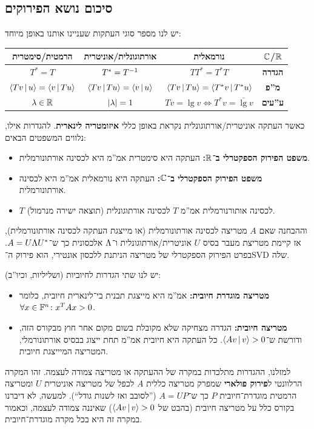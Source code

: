 \documentclass[name=רשימות אלגברה לינארית 2א]{../../../tex/classes/megasumPreamble}
\begin{document}
	\subsection{סיכום נושא הפירוקים}
	יש לנו מספר סוגי העתקות שעניינו אותנו באופן מיוחד: 
	\begin{center}\begin{tabular}{|c|c|c|c|}
			\hline \textbf{הרמטית}/\textbf{סימטרית} & \textbf{אורתוגונלית}/\textbf{אוניטרית} & \textbf{נורמאלית} & \textbf{$\mathbb{C}$/$\mathbb{R}$} \\
			\hline $T^* = T$ & $T^* = T^{-1}$ & $TT^* = T^*T$ & \textbf{הגדרה} \\
			\hline $\left \langle Tv \,\middle|\, u \right \rangle = \left \langle v \,\middle|\, Tu \right \rangle$ & $\left \langle Tv \,\middle|\, Tu \right \rangle = \left \langle v \,\middle|\, u \right \rangle$ & $\left \langle Tv \,\middle|\, Tu \right \rangle = \left \langle T^*v \,\middle|\, T^*u \right \rangle$ & \textbf{מ''פ} \\
			\hline $\lambda \in \mathbb{R}$ & $\left \lvert \lambda \right \rvert = 1$ & $Tv = \lg v \iff T^*v = \bar\lg v$ & \textbf{ע''עים} \\
			\hline
	\end{tabular}\end{center}
	
	כאשר העתקה אוניטרית/אורתוגונלית נקראת באופן כללי \textbf{איזומטריה לינארית}. להגדרות אילו, נלווים המשפטים הבאים: 
	\begin{itemize}
		\item \textbf{משפט הפירוק הספקטרלי ב־$\bm{\mathbb{R}}$: }העתקה היא סימטרית אמ''מ היא לכסינה אורתונורמלית. 
		\item \textbf{משפט הפירוק הספקטרלי ב־$\bm{\mathbb{C}}$: }העתקה היא נורמאלית אמ''מ היא לכסינה אורתונורמלית. 
		\item $T$ לכסינה אותורנורמלית אמ''מ $T$ לכסינה אורתוגונלית (תוצאה ישירה מנרמול). 
	\end{itemize}
	וההבחנה שאם $A$ מטריצה לכסינה אורתונורמלית (או מייצגת העתקה לכסינה אורתונורמלית), אז קיימת מטריצת מעבר בסיס $U$ אוניטרית/אורתוגונלית ו־$\Lambda$ אלכסונית כך ש־$A = U\Lambda U^*$. בפרט הפירוק הספקטרלי של מטריצה הניתנת ללכסון אונטירי, הוא פירוק ה־SVD שלה. 
	
	יש לנו שתי הגדרות לחיוביות (ושליליות, וכיו''ב): 
	\begin{itemize}
		\item \textbf{מטריצה מוגדרת חיובית: }אמ''מ היא מייצגת תבנית בי־לינארית חיובית, כלומר $\forall x \in \mathbb{F}^{n} \colon x^TAx > 0$. 
		\item \textbf{מטריצה חיובית: }הגדרה מצחיקה שלא מקובלת בשום מקום אחר חוץ מבקורס הזה, ודורשת ש־$\left \langle Av \,\middle|\, v \right \rangle > 0$. כל העתקה היא חיובית אמ''מ תחת ייצוג בבסיס אורתונורמלי, המטריצה המיייצגת חיובית. 
	\end{itemize}
	למזלנו, ההגדרות מתלכדות במקרה של ההעתקה או מטריצה צמודה לעצמה. זהו המקרה הרלוונטי ל\textbf{פירוק פולארי} שמפרק מטריצה כללית $A$ לכפל של מטריצה אוניטרית $U$ ומטריצה הרמטית מוגדרת־חיובית $P$ כך ש־$A = UP$ (''לסובב ואז לשנות גודל``). למעשה, לא דיברנו בקורס כלל על מטריצה חיובית (בהבט של $\left \langle Av \,\middle|\, v \right \rangle > 0$) שאיננה צמודה לעצמה, וכאמור במקרה זה היא בכל מקרה מוגדרת־חיובית. 
	
\end{document}
